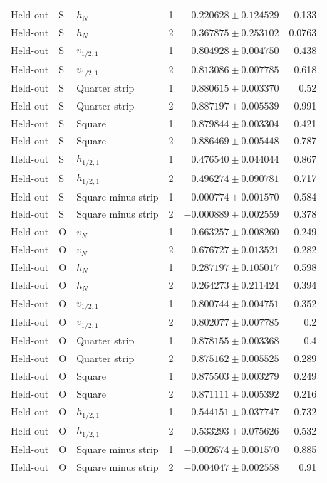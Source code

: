 {\begin{longtable}{lllrrr}
Held-out & S & $h_N$ & 1 & $0.220628\pm0.124529$ & 0.133\\
Held-out & S & $h_N$ & 2 & $0.367875\pm0.253102$ & 0.0763\\
Held-out & S & $v_{1/2,1}$ & 1 & $0.804928\pm0.004750$ & 0.438\\
Held-out & S & $v_{1/2,1}$ & 2 & $0.813086\pm0.007785$ & 0.618\\
Held-out & S & Quarter strip & 1 & $0.880615\pm0.003370$ & 0.52\\
Held-out & S & Quarter strip & 2 & $0.887197\pm0.005539$ & 0.991\\
Held-out & S & Square & 1 & $0.879844\pm0.003304$ & 0.421\\
Held-out & S & Square & 2 & $0.886469\pm0.005448$ & 0.787\\
Held-out & S & $h_{1/2,1}$ & 1 & $0.476540\pm0.044044$ & 0.867\\
Held-out & S & $h_{1/2,1}$ & 2 & $0.496274\pm0.090781$ & 0.717\\
Held-out & S & Square minus strip & 1 & $-0.000774\pm0.001570$ & 0.584\\
Held-out & S & Square minus strip & 2 & $-0.000889\pm0.002559$ & 0.378\\
Held-out & O & $v_N$ & 1 & $0.663257\pm0.008260$ & 0.249\\
Held-out & O & $v_N$ & 2 & $0.676727\pm0.013521$ & 0.282\\
Held-out & O & $h_N$ & 1 & $0.287197\pm0.105017$ & 0.598\\
Held-out & O & $h_N$ & 2 & $0.264273\pm0.211424$ & 0.394\\
Held-out & O & $v_{1/2,1}$ & 1 & $0.800744\pm0.004751$ & 0.352\\
Held-out & O & $v_{1/2,1}$ & 2 & $0.802077\pm0.007785$ & 0.2\\
Held-out & O & Quarter strip & 1 & $0.878155\pm0.003368$ & 0.4\\
Held-out & O & Quarter strip & 2 & $0.875162\pm0.005525$ & 0.289\\
Held-out & O & Square & 1 & $0.875503\pm0.003279$ & 0.249\\
Held-out & O & Square & 2 & $0.871111\pm0.005392$ & 0.216\\
Held-out & O & $h_{1/2,1}$ & 1 & $0.544151\pm0.037747$ & 0.732\\
Held-out & O & $h_{1/2,1}$ & 2 & $0.533293\pm0.075626$ & 0.532\\
Held-out & O & Square minus strip & 1 & $-0.002674\pm0.001570$ & 0.885\\
Held-out & O & Square minus strip & 2 & $-0.004047\pm0.002558$ & 0.91\\

\end{longtable}}
